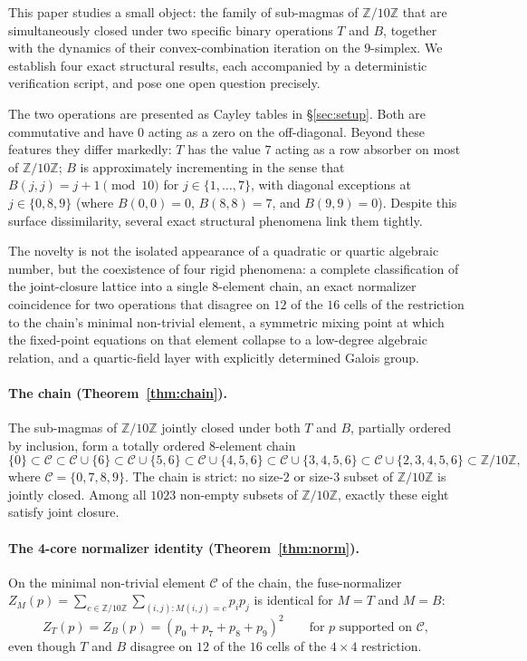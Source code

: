 \documentclass[11pt,reqno]{amsart}
\theoremstyle{plain}
\theoremstyle{definition}
\theoremstyle{remark}
\newcommand{\Z}{\mathbb{Z}}
\newcommand{\Zten}{\Z/10\Z}
\newcommand{\Cfour}{\mathcal{C}}
\begin{document}
This paper studies a small object: the family of sub-magmas of
$\Zten$ that are simultaneously closed under two specific binary
operations $T$ and $B$, together with the dynamics of their
convex-combination iteration on the $9$-simplex. We establish
four exact structural results, each accompanied by a deterministic
verification script, and pose one open question precisely.

The two operations are presented as Cayley tables in
\S\ref{sec:setup}. Both are commutative and have $0$ acting as a
zero on the off-diagonal. Beyond these features they differ
markedly: $T$ has the value $7$ acting as a row absorber on most
of $\Zten$; $B$ is approximately incrementing in the sense that
$B(j,j)=j+1\pmod{10}$ for $j\in\{1,\dots,7\}$, with diagonal
exceptions at $j\in\{0,8,9\}$ (where $B(0,0)=0$, $B(8,8)=7$, and
$B(9,9)=0$). Despite this surface dissimilarity,
several exact structural phenomena link them tightly.

The novelty is not the isolated appearance of a quadratic or
quartic algebraic number, but the coexistence of four rigid
phenomena: a complete classification of the joint-closure lattice
into a single $8$-element chain, an exact normalizer coincidence
for two operations that disagree on $12$ of the $16$ cells of the
restriction to the chain's minimal non-trivial element, a
symmetric mixing point at which the fixed-point equations on that
element collapse to a low-degree algebraic relation, and a
quartic-field layer with explicitly determined Galois group.

\paragraph{The chain (Theorem~\ref{thm:chain}).} The sub-magmas of
$\Zten$ jointly closed under both $T$ and $B$, partially ordered
by inclusion, form a totally ordered $8$-element chain
\[
\{0\}\subset\Cfour\subset\Cfour\cup\{6\}\subset\Cfour\cup\{5,6\}\subset
\Cfour\cup\{4,5,6\}\subset\Cfour\cup\{3,4,5,6\}\subset
\Cfour\cup\{2,3,4,5,6\}\subset\Zten,
\]
where $\Cfour=\{0,7,8,9\}$. The chain is strict: no size-$2$ or
size-$3$ subset of $\Zten$ is jointly closed. Among all $1023$
non-empty subsets of $\Zten$, exactly these eight satisfy joint
closure.

\paragraph{The 4-core normalizer identity (Theorem~\ref{thm:norm}).}
On the minimal non-trivial element $\Cfour$ of the chain, the
fuse-normalizer
$Z_{M}(p)=\sum_{c\in\Zten}\sum_{(i,j):M(i,j)=c}p_{i}p_{j}$ is
identical for $M=T$ and $M=B$:
\[
Z_{T}(p)=Z_{B}(p)=(p_{0}+p_{7}+p_{8}+p_{9})^{2}\qquad\text{for }p\text{ supported on }\Cfour,
\]
even though $T$ and $B$ disagree on $12$ of the $16$ cells of the
$4\times 4$ restriction.
\end{document}
